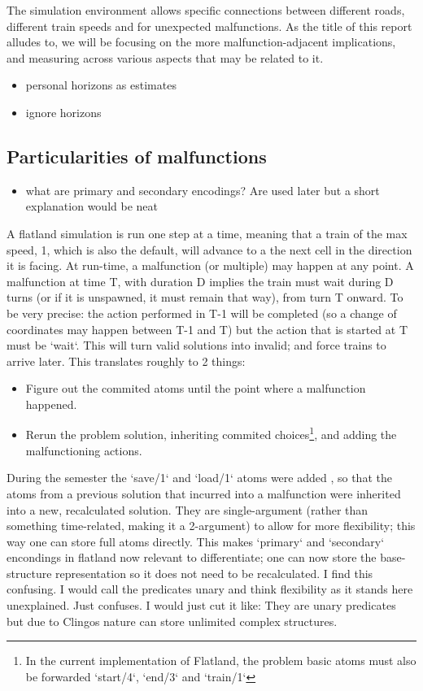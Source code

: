 \documentclass{llncs}
\begin{document}
The simulation environment allows specific connections between different roads, different train speeds and for unexpected malfunctions. As the title of this report alludes to, we will be focusing on the more malfunction-adjacent implications, and measuring across various aspects that may be related to it.

\color{green}
\begin{itemize}
	\item personal horizons as estimates
	\item ignore horizons
\end{itemize}
\color{black}

\subsection{Particularities of malfunctions}
\color{green}
\begin{itemize}
	\item what are primary and secondary encodings? Are used later but a short explanation would be neat
\end{itemize}
\color{black}
A flatland simulation is run one step at a time, meaning that a train of the max speed, 1, which is also the default, will advance to a the next cell in the direction it is facing. At run-time, a malfunction (or multiple) may happen at any point. A malfunction at time T, with duration D implies the train must wait during D turns (or if it is unspawned, it must remain that way), from turn T onward. To be very precise: the action performed in T-1 will be completed (so a change of coordinates may happen between T-1 and T) but the action that is started at T must be `wait`. This will turn valid solutions into invalid; and force trains to arrive later. This translates roughly to 2 things:
\begin{itemize}
	\item Figure out the commited atoms until the point where a malfunction happened.
	\item Rerun the problem solution, inheriting commited choices\footnote{In the current implementation of Flatland, the problem basic atoms must also be forwarded `start/4`, `end/3` and `train/1`}, and adding the malfunctioning actions.
\end{itemize}
During the semester the `save/1`  and `load/1` atoms were added \cite{malfunction_branch}, so that the atoms from a previous solution that incurred into a malfunction were inherited into a new, recalculated solution. \color{green} They are single-argument (rather than something time-related, making it a 2-argument) to allow for more flexibility; this way one can store full atoms directly. This makes `primary` and `secondary` encondings in flatland now relevant to differentiate; one can now store the base-structure representation so it does not need to be recalculated. \color{black} \color{gray} I find this confusing. I would call the predicates unary and think flexibility as it stands here unexplained. Just confuses. I would just cut it like: They are unary predicates but due to Clingos nature can store unlimited complex structures. \color{black}
\end{document}

